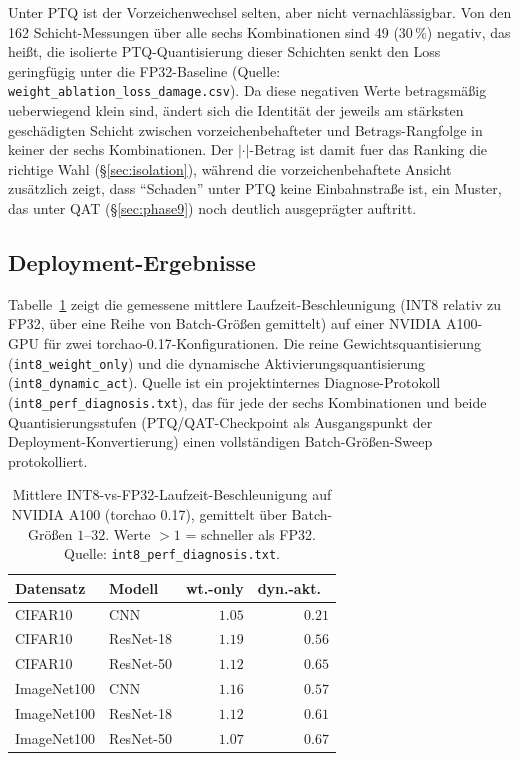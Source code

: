 Unter PTQ ist der Vorzeichenwechsel selten, aber nicht vernachlässigbar. Von den 162 Schicht-Messungen über alle sechs Kombinationen sind 49 ($30\,\%$) negativ, das heißt, die isolierte PTQ-Quantisierung dieser Schichten senkt den Loss geringfügig unter die FP32-Baseline (Quelle: \texttt{weight\_ablation\_loss\_damage.csv}). Da diese negativen Werte betragsmäßig ueberwiegend klein sind, ändert sich die Identität der jeweils am stärksten geschädigten Schicht zwischen vorzeichenbehafteter und Betrags-Rangfolge in keiner der sechs Kombinationen. Der $|\cdot|$-Betrag ist damit fuer das Ranking die richtige Wahl (\S\ref{sec:isolation}), während die vorzeichenbehaftete Ansicht zusätzlich zeigt, dass \enquote{Schaden} unter PTQ keine Einbahnstraße ist, ein Muster, das unter QAT (\S\ref{sec:phase9}) noch deutlich ausgeprägter auftritt.

\subsection{Deployment-Ergebnisse}
\label{sec:phase10}

Tabelle~\ref{tab:deployment} zeigt die gemessene mittlere Laufzeit-Beschleunigung (INT8 relativ zu FP32, über eine Reihe von Batch-Größen gemittelt) auf einer NVIDIA A100-GPU für zwei torchao-0.17-Konfigurationen. Die reine Gewichtsquantisierung (\texttt{int8\_weight\_only}) und die dynamische Aktivierungsquantisierung (\texttt{int8\_dynamic\_act}). Quelle ist ein projektinternes Diagnose-Protokoll (\texttt{int8\_perf\_diagnosis.txt}), das für jede der sechs Kombinationen und beide Quantisierungsstufen (PTQ/QAT-Checkpoint als Ausgangspunkt der Deployment-Konvertierung) einen vollständigen Batch-Größen-Sweep protokolliert.

\begin{table}[t]
\centering
\small
\caption{Mittlere INT8-vs-FP32-Laufzeit-Beschleunigung auf NVIDIA A100 (torchao 0.17), gemittelt über Batch-Größen $1$--$32$. Werte $>1$ = schneller als FP32. Quelle: \texttt{int8\_perf\_diagnosis.txt}.}
\label{tab:deployment}
\begin{tabular}{llrr}
\toprule
Datensatz & Modell & wt.-only & dyn.-akt.\ \\
\midrule
CIFAR10 & CNN & $1.05$ & $0.21$ \\
CIFAR10 & ResNet-18 & $1.19$ & $0.56$ \\
CIFAR10 & ResNet-50 & $1.12$ & $0.65$ \\
ImageNet100 & CNN & $1.16$ & $0.57$ \\
ImageNet100 & ResNet-18 & $1.12$ & $0.61$ \\
ImageNet100 & ResNet-50 & $1.07$ & $0.67$ \\
\bottomrule
\end{tabular}
\end{table}

